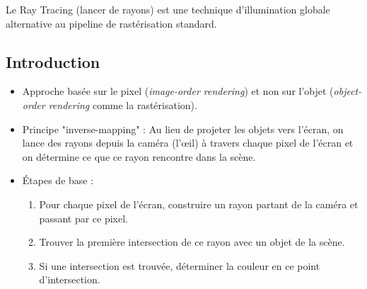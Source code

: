 \documentclass{article}
\begin{document}
Le Ray Tracing (lancer de rayons) est une technique d'illumination globale alternative au pipeline de rastérisation standard.

\subsection{Introduction}
\begin{itemize}
    \item Approche basée sur le pixel (\textit{image-order rendering}) et non sur l'objet (\textit{object-order rendering} comme la rastérisation).
    \item Principe "inverse-mapping" : Au lieu de projeter les objets vers l'écran, on lance des rayons depuis la caméra (l'œil) à travers chaque pixel de l'écran et on détermine ce que ce rayon rencontre dans la scène.
    \item Étapes de base :
        \begin{enumerate}
            \item  Pour chaque pixel de l'écran, construire un rayon partant de la caméra et passant par ce pixel.
            \item  Trouver la première intersection de ce rayon avec un objet de la scène.
            \item  Si une intersection est trouvée, déterminer la couleur en ce point d'intersection.
        \end{enumerate}
\end{itemize}
\end{document}
